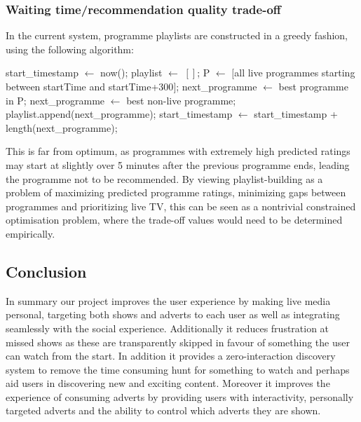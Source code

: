 	\subsubsection{Waiting time/recommendation quality trade-off}
	In the current system, programme playlists are constructed in a greedy fashion, using the following algorithm:
	\begin{algorithmic}[H]
	\State start\_timestamp $\gets$ now();
	\State playlist $\gets$ $[]$;
		\State P $\gets$ $[$all live programmes starting between startTime and startTime+300$]$;
			\State next\_programme $\gets$ best programme in P;
		\Else
			\State next\_programme $\gets$ best non-live programme;
		\EndIf
		\State playlist.append(next\_programme);
		\State start\_timestamp $\gets$ start\_timestamp + length(next\_programme);
	\EndWhile
	\end{algorithmic}
	This is far from optimum, as programmes with extremely high predicted ratings may start at slightly over 5 minutes after the previous programme ends, leading the programme not to be recommended. By viewing playlist-building as a problem of maximizing predicted programme ratings, minimizing gaps between programmes and prioritizing live TV, this can be seen as a nontrivial constrained optimisation problem, where the trade-off values would need to be determined empirically.

	\subsection{Conclusion}
In summary our project improves the user experience by making live media personal, targeting both shows and adverts to each user as well as integrating seamlessly with the social experience. Additionally it reduces frustration at missed shows as these are transparently skipped in favour of something the user can watch from the start. In addition it provides a zero-interaction discovery system to remove the time consuming hunt for something to watch and perhaps aid users in discovering new and exciting content. Moreover it improves the experience of consuming adverts by providing users with interactivity, personally targeted adverts and the ability to control which adverts they are shown. 
